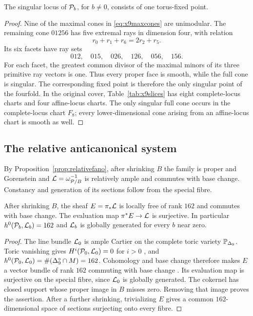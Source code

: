 \begin{proposition}\label{prop:charts}
The singular locus of $\mathcal{P}_b$, for $b\ne0$, consists of one
torus-fixed point.
\end{proposition}
\begin{proof}
Nine of the maximal cones in \eqref{eq:x9maxcones} are unimodular.
The remaining cone $01256$ has five extremal rays in dimension
four, with relation
\[
r_0+r_1+r_6=2r_2+r_5.
\]
Its six facets have ray sets
\[
012,\quad015,\quad026,\quad126,\quad056,\quad156.
\]
For each facet, the greatest common divisor of the maximal minors
of its three primitive ray vectors is one.  Thus every proper
face is smooth, while the full cone is singular.  The corresponding
fixed point is therefore the only singular point of the fourfold.
In the original cover, Table~\ref{tab:x9slices} has eight
complete-locus charts and four affine-locus charts.  The only
singular full cone occurs in the complete-locus chart $F_8$;
every lower-dimensional cone arising from an affine-locus chart
is smooth as well.
\end{proof}

\subsection{The relative anticanonical system}\label{sec:h0}

By Proposition~\ref{prop:relativefano}, after shrinking $B$ the
family is proper and Gorenstein and
$\mathcal{L}=\omega_{\mathcal{P}/B}^{-1}$ is relatively ample and commutes with
base change.  Constancy and generation of its sections follow
from the special fibre.

\begin{proposition}\label{prop:h0}\label{prop:gg}
After shrinking $B$, the sheaf $E=\pi_*\mathcal{L}$ is locally free of
rank $162$ and commutes with base change.  The evaluation map
$\pi^*E\to\mathcal{L}$ is surjective.  In particular
$h^0(\mathcal{P}_b,\mathcal{L}_b)=162$ and $\mathcal{L}_b$ is globally generated for every
$b$ near zero.
\end{proposition}
\begin{proof}
The line bundle $\mathcal{L}_0$ is ample Cartier on the complete toric
variety $\mathbb{P}_{\Delta_9}$.  Toric vanishing gives
$H^i(\mathcal{P}_0,\mathcal{L}_0)=0$ for $i>0$
\cite[Thm.~9.2.3]{CoxLittleSchenck}, and
$h^0(\mathcal{P}_0,\mathcal{L}_0)=\#(\Delta_9^\circ\cap M)=162$.
Cohomology and base change therefore makes $E$ a vector bundle of
rank $162$ commuting with base change
\cite[Tag~07VK]{Stacks}.  Its evaluation map is surjective on
the special fibre, since $\mathcal{L}_0$ is globally generated.  The
cokernel has closed support whose proper image in $B$ misses
zero.  Removing that image proves the assertion.  After a further
shrinking, trivializing $E$ gives a common $162$-dimensional
space of sections surjecting onto every fibre.
\end{proof}

